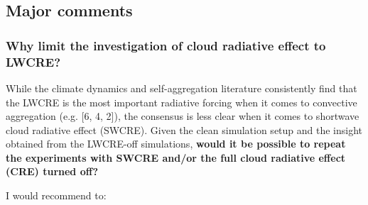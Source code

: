 \documentclass[draft]{agujournal2019}
\begin{document}
\subsection{Major comments}
\subsubsection{Why limit the investigation of cloud radiative effect to LWCRE?}
While the climate dynamics and self-aggregation literature consistently find that the LWCRE is the most important
radiative forcing when it comes to convective aggregation (e.g. [6, 4, 2]), the consensus is less clear when it comes to
shortwave cloud radiative effect (SWCRE). Given the clean simulation setup and the insight obtained from the LWCRE-off
simulations, \textbf{would it be possible to repeat the experiments with SWCRE and/or the full cloud radiative
effect (CRE) turned off?}

I would recommend to:
\end{document}
